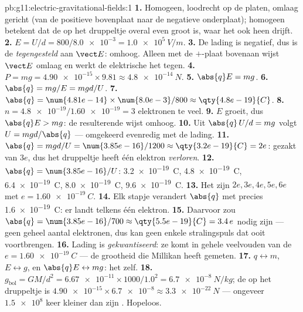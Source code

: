 \begin{solution}{pb:g11:electric-gravitational-fields:1}
\textbf{1.} Homogeen, loodrecht op de platen, omlaag gericht (van de
positieve bovenplaat naar de negatieve onderplaat); homogeen betekent dat
de  op het druppeltje overal even groot is, waar het ook heen
drijft.
\textbf{2.} $E = U/d = 800 / \num{8.0e-3} = \qty{1.0e5}{V/m}$.
\textbf{3.} De lading is negatief, dus is de  \emph{tegengesteld}
aan $\vect E$: omhoog. Alleen met de $+$-plaat bovenaan wijst $\vect E$
omlaag en werkt de elektrische  het  tegen.
\textbf{4.} $P = mg = \num{4.90e-15} \times 9.81 \approx
\qty{4.8e-14}{N}$.
\textbf{5.} $\abs{q}E = mg$.
\textbf{6.} $\abs{q} = mg/E = mgd/U$.
\textbf{7.} $\abs{q} = \num{4.81e-14} \times \num{8.0e-3} / 800
\approx \qty{4.8e-19}{C}$.
\textbf{8.} $n = \num{4.8e-19} / \num{1.60e-19} = 3$ elektronen te veel.
\textbf{9.} $E$ groeit, dus $\abs{q}E > mg$: de resulterende  wijst
omhoog.
\textbf{10.} Uit $\abs{q}\,U/d = mg$ volgt $U = mgd/\abs{q}$ ---
omgekeerd evenredig met de lading.
\textbf{11.} $\abs{q} = mgd/U = \num{3.85e-16}/1200 \approx
\qty{3.2e-19}{C} = 2e$: gezakt van $3e$, dus het druppeltje heeft één
elektron \emph{verloren}.
\textbf{12.} $\abs{q} = \num{3.85e-16}/U$: \qty{3.2e-19}{C},
\qty{4.8e-19}{C}, \qty{6.4e-19}{C}, \qty{8.0e-19}{C},
\qty{9.6e-19}{C}.
\textbf{13.} Het zijn $2e, 3e, 4e, 5e, 6e$ met
$e = \qty{1.60e-19}{C}$.
\textbf{14.} Elk stapje verandert $\abs{q}$ met precies
\qty{1.6e-19}{C}: er landt telkens één elektron.
\textbf{15.} Daarvoor zou $\abs{q} = \num{3.85e-16}/700 \approx
\qty{5.5e-19}{C} = 3.4\,e$ nodig zijn --- geen geheel aantal elektronen,
dus kan geen enkele stralingspuls dat ooit voortbrengen.
\textbf{16.} Lading is \emph{gekwantiseerd}: ze komt in gehele veelvouden
van de  $e = \qty{1.60e-19}{C}$ --- de grootheid die
Millikan heeft gemeten.
\textbf{17.} $q \leftrightarrow m$, $E \leftrightarrow g$, en
$\abs{q}E \leftrightarrow mg$: het  zelf.
\textbf{18.} $g_{\text{bol}} = GM/d^2 = \num{6.67e-11} \times 1000 /
1.0^2 = \qty{6.7e-8}{N/kg}$; de  op het druppeltje is
$\num{4.90e-15} \times \num{6.7e-8} \approx \qty{3.3e-22}{N}$ ---
ongeveer $\num{1.5e8}$ keer kleiner dan zijn . Hopeloos.

\end{solution}
